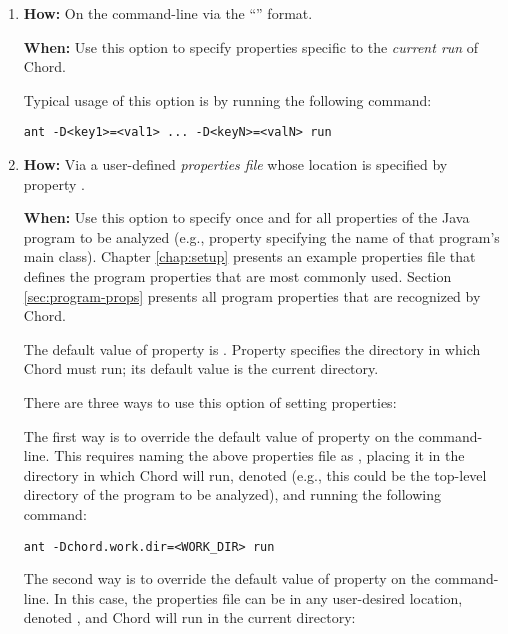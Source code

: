 \begin{enumerate}
\item

{\bf How:} On the command-line via the ``'' format.

{\bf When:} Use this option to specify properties specific to the {\it current run} of Chord.

Typical usage of this option is by running the following command:

\begin{framed}
\begin{verbatim}
ant -D<key1>=<val1> ... -D<keyN>=<valN> run
\end{verbatim}
\end{framed}

\item

{\bf How:} Via a user-defined {\it properties file} whose location is specified by property .

{\bf When:} Use this option to specify once and for all properties of the
Java program to be analyzed (e.g., property  specifying the
name of that program's main class).
Chapter \ref{chap:setup} presents an example properties file 
that defines the program properties that are most commonly used.  Section \ref{sec:program-props}
presents all program properties that are recognized by Chord. 

The default value of property  is .
Property  specifies the directory in which Chord must run; its default value
is the current directory.

There are three ways to use this option of setting properties:

The first way is to override the default value of property  on the command-line.
This requires naming the above properties file as , placing it in the
directory in which Chord will run, denoted 
(e.g., this could be the top-level directory of the program to be analyzed),
and running the following command:

\begin{framed}
\begin{verbatim}
ant -Dchord.work.dir=<WORK_DIR> run
\end{verbatim}
\end{framed}

The second way is to override the default value of property  on the command-line.
In this case, the properties file can be in any user-desired location, denoted , and Chord
will run in the current directory:


\end{enumerate}
